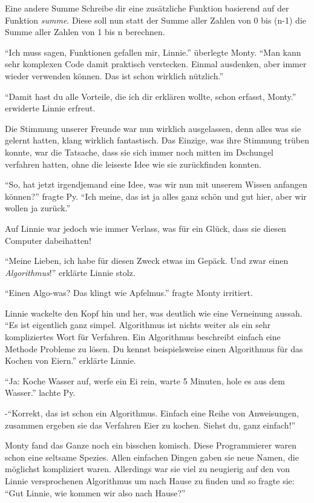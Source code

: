 \documentclass[a5paper,12pt,twoside,openright]{scrbook}
\begin{document}
\begin{aufgabe}{Eine andere Summe}
 Schreibe dir eine zusätzliche Funktion basierend auf der Funktion \emph{summe}.
 Diese soll nun statt der Summe aller Zahlen von 0 bis (n-1) die Summe aller Zahlen von 1 bis n berechnen.
\end{aufgabe}

"`Ich muss sagen, Funktionen gefallen mir, Linnie."' überlegte Monty.
"`Man kann sehr komplexen Code damit praktisch verstecken. Einmal ausdenken, aber immer wieder verwenden können.
Das ist schon wirklich nützlich."'

"`Damit hast du alle Vorteile, die ich dir erklären wollte, schon erfasst, Monty."' erwiderte Linnie erfreut.

Die Stimmung unserer Freunde war nun wirklich ausgelassen, 
denn alles was sie gelernt hatten, klang wirklich fantastisch.
Das Einzige, was ihre Stimmung trüben konnte, war die Tatsache, dass sie sich 
immer noch mitten im Dschungel verfahren hatten, ohne die leiseste Idee wie sie 
zurückfinden konnten.

"`So, hat jetzt irgendjemand eine Idee, was wir nun mit unserem Wissen anfangen können?"' fragte Py.
"`Ich meine, das ist ja alles ganz schön und gut hier, aber wir wollen ja zurück."'

Auf Linnie war jedoch wie immer Verlass, was für ein Glück, dass sie diesen Computer dabeihatten!

"`Meine Lieben, ich habe für diesen Zweck etwas im Gepäck. Und zwar einen \emph{Algorithmus}!"' erklärte Linnie stolz.

"`Einen Algo-was? Das klingt wie Apfelmus."' fragte Monty irritiert.

Linnie wackelte den Kopf hin und her, was deutlich wie eine Verneinung aussah.
"`Es ist eigentlich ganz simpel. Algorithmus ist nichts weiter als ein sehr kompliziertes Wort für Verfahren.
Ein Algorithmus beschreibt einfach eine Methode Probleme zu lösen. 
Du kennst beispielsweise einen Algorithmus für das Kochen von Eiern."' erklärte Linnie.

"`Ja: Koche Wasser auf, werfe ein Ei rein, warte 5 Minuten, hole es aus dem Wasser."' lachte Py.

-"`Korrekt, das ist schon ein Algorithmus. Einfach eine Reihe von Anweisungen, zusammen ergeben sie das Verfahren Eier zu kochen.
Siehst du, ganz einfach!"'

Monty fand das Ganze noch ein bisschen komisch. Diese Programmierer waren schon eine seltsame Spezies.
Allen einfachen Dingen gaben sie neue Namen, die möglichst kompliziert waren.
Allerdings war sie viel zu neugierig auf den von Linnie versprochenen Algorithmus um nach Hause zu finden 
und so fragte sie:
"`Gut Linnie, wie kommen wir also nach Hause?"'
\end{document}
